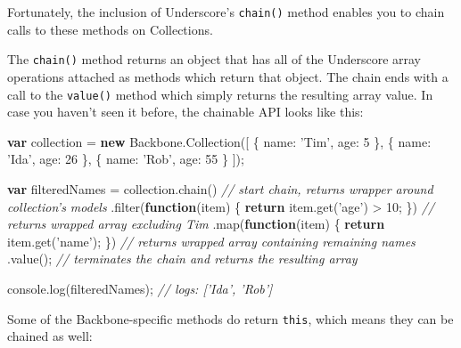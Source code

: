 \documentclass[9pt]{book}
\newenvironment{Shaded}{}{}
\newcommand{\KeywordTok}[1]{\textcolor[rgb]{0.00,0.44,0.13}{\textbf{{#1}}}}
\newcommand{\DataTypeTok}[1]{\textcolor[rgb]{0.56,0.13,0.00}{{#1}}}
\newcommand{\DecValTok}[1]{\textcolor[rgb]{0.25,0.63,0.44}{{#1}}}
\newcommand{\StringTok}[1]{\textcolor[rgb]{0.25,0.44,0.63}{{#1}}}
\newcommand{\CommentTok}[1]{\textcolor[rgb]{0.38,0.63,0.69}{\textit{{#1}}}}
\newcommand{\OtherTok}[1]{\textcolor[rgb]{0.00,0.44,0.13}{{#1}}}
\newcommand{\FunctionTok}[1]{\textcolor[rgb]{0.02,0.16,0.49}{{#1}}}
\newcommand{\NormalTok}[1]{{#1}}
\begin{document}
Fortunately, the inclusion of Underscore's \texttt{chain()} method
enables you to chain calls to these methods on Collections.

The \texttt{chain()} method returns an object that has all of the
Underscore array operations attached as methods which return that
object. The chain ends with a call to the \texttt{value()} method which
simply returns the resulting array value. In case you haven't seen it
before, the chainable API looks like this:

\begin{Shaded}
\begin{Highlighting}[]
\KeywordTok{var} \NormalTok{collection = }\KeywordTok{new} \OtherTok{Backbone}\NormalTok{.}\FunctionTok{Collection}\NormalTok{([}
  \NormalTok{\{ }\DataTypeTok{name}\NormalTok{: }\StringTok{'Tim'}\NormalTok{, }\DataTypeTok{age}\NormalTok{: }\DecValTok{5} \NormalTok{\},}
  \NormalTok{\{ }\DataTypeTok{name}\NormalTok{: }\StringTok{'Ida'}\NormalTok{, }\DataTypeTok{age}\NormalTok{: }\DecValTok{26} \NormalTok{\},}
  \NormalTok{\{ }\DataTypeTok{name}\NormalTok{: }\StringTok{'Rob'}\NormalTok{, }\DataTypeTok{age}\NormalTok{: }\DecValTok{55} \NormalTok{\}}
\NormalTok{]);}

\KeywordTok{var} \NormalTok{filteredNames = }\OtherTok{collection}\NormalTok{.}\FunctionTok{chain}\NormalTok{() }\CommentTok{// start chain, returns wrapper around collection's models}
  \NormalTok{.}\FunctionTok{filter}\NormalTok{(}\KeywordTok{function}\NormalTok{(item) \{ }\KeywordTok{return} \OtherTok{item}\NormalTok{.}\FunctionTok{get}\NormalTok{(}\StringTok{'age'}\NormalTok{) > }\DecValTok{10}\NormalTok{; \}) }\CommentTok{// returns wrapped array excluding Tim}
  \NormalTok{.}\FunctionTok{map}\NormalTok{(}\KeywordTok{function}\NormalTok{(item) \{ }\KeywordTok{return} \OtherTok{item}\NormalTok{.}\FunctionTok{get}\NormalTok{(}\StringTok{'name'}\NormalTok{); \}) }\CommentTok{// returns wrapped array containing remaining names}
  \NormalTok{.}\FunctionTok{value}\NormalTok{(); }\CommentTok{// terminates the chain and returns the resulting array}

\OtherTok{console}\NormalTok{.}\FunctionTok{log}\NormalTok{(filteredNames); }\CommentTok{// logs: ['Ida', 'Rob']}
\end{Highlighting}
\end{Shaded}

Some of the Backbone-specific methods do return \texttt{this}, which
means they can be chained as well:
\end{document}
